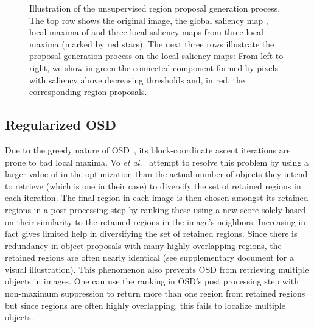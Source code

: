 \documentclass[runningheads]{llncs}
\begin{document}
\begin{figure*}[tb]
\begin{center}
			
	\end{center}
	\vspace{-0.4cm}
	\caption{\small Illustration of the unsupervised region proposal generation process. The top row shows the original image, the global saliency map , local maxima of  and three local saliency maps  from three local maxima (marked by red stars). The next three rows illustrate the proposal generation process on the local saliency maps: From left to right, we show in green the connected component formed by pixels with saliency above decreasing thresholds and, in red, the corresponding region proposals. 
}
	\label{fig:unsup_proposals}
	\vspace{-0.6cm}
\end{figure*} 
\subsection{Regularized OSD}
\label{sec:rOSD}
Due to the greedy nature of OSD~\cite{Vo2019UnsupOptim}, its block-coordinate ascent iterations are prone to bad local maxima. Vo {\em et al.}~\cite{Vo2019UnsupOptim} attempt to resolve this problem by using a larger value of  in the optimization than the actual number of objects they intend to retrieve (which is one in their case) to diversify the set of retained regions in each iteration. The final region in each image is then chosen amongst its retained regions in a post processing step by ranking these using a new score solely based on their similarity to the retained regions in the image's neighbors. Increasing  in fact gives limited help in diversifying the set of retained regions. Since there is redundancy in object proposals with many highly overlapping regions, the  retained regions are often nearly identical (see supplementary document for a visual illustration). This phenomenon also prevents OSD from retrieving multiple objects in images. One can use the ranking in OSD's post processing step with non-maximum suppression to return more than one region from  retained regions but since  regions are often highly overlapping, this fails to localize multiple objects. 
\end{document}
